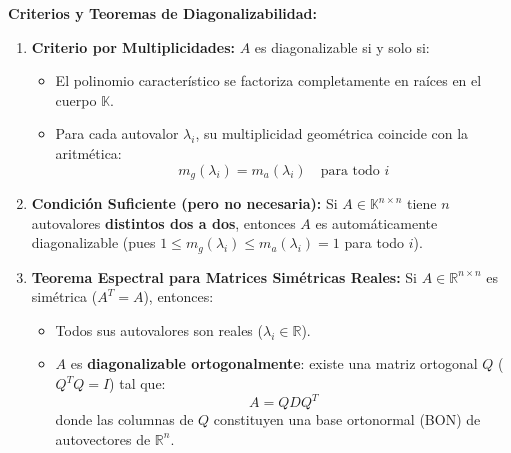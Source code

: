 \documentclass[11pt,a4paper]{article}
\begin{document}
\vspace{0.5em}
\noindent
\textbf{Criterios y Teoremas de Diagonalizabilidad:}
\begin{enumerate}
    \item \textbf{Criterio por Multiplicidades:} $A$ es diagonalizable si y solo si:
    \begin{itemize}
        \item El polinomio característico se factoriza completamente en raíces en el cuerpo $\mathbb{K}$.
        \item Para cada autovalor $\lambda_i$, su multiplicidad geométrica coincide con la aritmética:
        \[
        m_g(\lambda_i) = m_a(\lambda_i) \quad \text{para todo } i
        \]
    \end{itemize}
    \item \textbf{Condición Suficiente (pero no necesaria):} Si $A \in \mathbb{K}^{n \times n}$ tiene $n$ autovalores \textbf{distintos dos a dos}, entonces $A$ es automáticamente diagonalizable (pues $1 \le m_g(\lambda_i) \le m_a(\lambda_i) = 1$ para todo $i$).
    \item \textbf{Teorema Espectral para Matrices Simétricas Reales:} Si $A \in \mathbb{R}^{n \times n}$ es simétrica ($A^T = A$), entonces:
    \begin{itemize}
        \item Todos sus autovalores son reales ($\lambda_i \in \mathbb{R}$).
        \item $A$ es \textbf{diagonalizable ortogonalmente}: existe una matriz ortogonal $Q$ ($Q^T Q = I$) tal que:
        \[
        A = Q D Q^T
        \]
        donde las columnas de $Q$ constituyen una base ortonormal (BON) de autovectores de $\mathbb{R}^n$.
    \end{itemize}
\end{enumerate}
\end{document}
